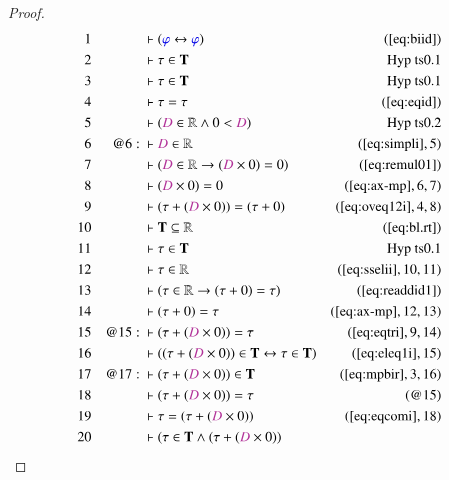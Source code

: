 \begin{proof}
\begin{align}
  1 &&  & \vdash ( \mw{\varphi} \leftrightarrow \mw{\varphi}
      )&(\mbox{\ref{eq:biid}})\notag
  \\ 2 &&  & \vdash \tau \in \mathbf{T}&\text{Hyp~ts0.1}\notag%
  \\ 3 &&  & \vdash \tau \in \mathbf{T}&\text{Hyp~ts0.1}\notag%
  \\ 4 &&  & \vdash \tau = \tau&(\mbox{\ref{eq:eqid}})\notag
  \\ 5 &&  & \vdash ( \mc{D} \in \mathbb{R} \wedge 0 < \mc{D}
      )&\text{Hyp~ts0.2}\notag%
  \\ 6 && @6:\  & \vdash \mc{D} \in \mathbb{R}&(\mbox{\ref{eq:simpli}},5)\notag
  \\ 7 &&  & \vdash ( \mc{D} \in \mathbb{R} \rightarrow ( \mc{D} \times 0 ) = 0
      )&(\mbox{\ref{eq:remul01}})\notag
  \\ 8 &&  & \vdash ( \mc{D} \times 0 ) = 0&(\mbox{\ref{eq:ax-mp}},6,7)\notag
  \\ 9 &&  & \vdash ( \tau + ( \mc{D} \times 0 ) ) = ( \tau + 0
      )&(\mbox{\ref{eq:oveq12i}},4,8)\notag
  \\ 10 &&  & \vdash \mathbf{T} \subseteq
      \mathbb{R}&(\mbox{\ref{eq:bl.rt}})\notag
  \\ 11 &&  & \vdash \tau \in \mathbf{T}&\text{Hyp~ts0.1}\notag%
  \\ 12 &&  & \vdash \tau \in \mathbb{R}&(\mbox{\ref{eq:sselii}},10,11)\notag
  \\ 13 &&  & \vdash ( \tau \in \mathbb{R} \rightarrow ( \tau + 0 ) = \tau
      )&(\mbox{\ref{eq:readdid1}})\notag
  \\ 14 &&  & \vdash ( \tau + 0 ) = \tau&(\mbox{\ref{eq:ax-mp}},12,13)\notag
  \\ 15 && @15:\  & \vdash ( \tau + ( \mc{D} \times 0 ) ) =
      \tau&(\mbox{\ref{eq:eqtri}},9,14)\notag
  \\ 16 &&  & \vdash ( ( \tau + ( \mc{D} \times 0 ) ) \in \mathbf{T}
      \leftrightarrow \tau \in \mathbf{T}
      )&(\mbox{\ref{eq:eleq1i}},15)\notag
  \\ 17 && @17:\  & \vdash ( \tau + ( \mc{D} \times 0 ) ) \in
      \mathbf{T}&(\mbox{\ref{eq:mpbir}},3,16)\notag
  \\ 18 &&  & \vdash ( \tau + ( \mc{D} \times 0 ) ) = \tau&(@15)\notag
  \\ 19 &&  & \vdash \tau = ( \tau + ( \mc{D} \times 0 )
      )&(\mbox{\ref{eq:eqcomi}},18)\notag
  \\ 20 &&  & \vdash ( \tau \in \mathbf{T} \wedge ( \tau + ( \mc{D} \times 0 ) )

\end{align}
\end{proof}
